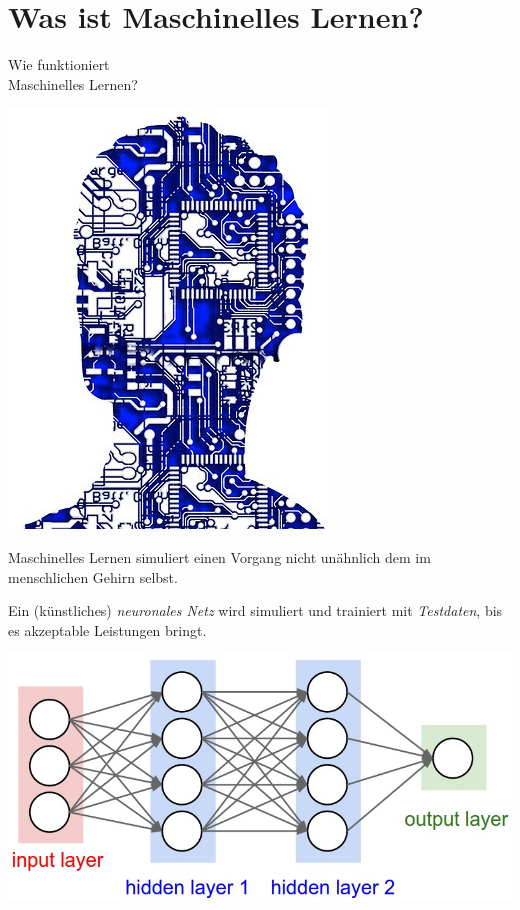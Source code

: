 \documentclass[aspectratio=43]{beamer}
\begin{document}

\section{Was ist Maschinelles Lernen?}

\begin{frame}
\begin{center}
\huge
Wie funktioniert\\Maschinelles Lernen?
\end{center}
\end{frame}

\begin{frame}
\begin{multicols}{2}
\includegraphics[scale=0.4]{images/artificial-intelligence-507813_640.jpg} 
\columnbreak

Maschinelles Lernen simuliert einen Vorgang nicht unähnlich dem im menschlichen Gehirn selbst.
\pause\bigskip

Ein (künstliches) \emph{neuronales Netz} wird simuliert und trainiert mit \emph{Testdaten}, bis es akzeptable Leistungen bringt.
\end{multicols}
\end{frame}

\begin{frame}
\begin{center}
\includegraphics[scale=0.375]{images/simple_neural_network_header.jpg} 
\end{center}
\end{frame}
\end{document}
